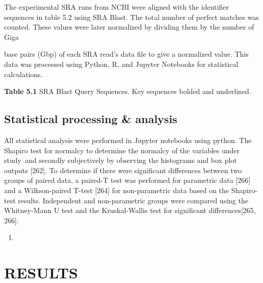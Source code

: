 The experimental SRA runs from NCBI were aligned with the identifier
sequences in table 5.2 using SRA Blast. The total number of perfect
matches was counted. These values were later normalized by dividing them
by the number of Giga{}{{}base pairs (Gbp) of each SRA read's data file to
give a normalized value. This data was processed using Python, R, and
Jupyter Notebooks for statistical calculations.

\textbf{Table 5.1} SRA Blast Query Sequences. Key sequences bolded and underlined.
%
%
%
%
%

\section{Statistical processing \&
analysis}\label{statistical-processing-analysis}

All statistical analysis were performed in Jupyter notebooks using
python. The Shapiro test for normalcy to determine the normalcy of the
variables under study~and secondly subjectively by observing the
histograms and box plot outputs {[}262{]}. To determine if there were
significant differences between two groups of paired data, a paired-T
test was performed for parametric data {[}266{]} and a Wilkson-paired
T-test {[}264{]} for non-parametric data based on the Shapiro-test
results. Independent and non-parametric groups were compared using the
Whitney-Mann U test and the Kruskal-Wallis test for significant
differences{[}265, 266{]}.

\begin{enumerate}
\def\labelenumi{\arabic{enumi}.}
\item
\end{enumerate}

\chapter{RESULTS}


}
